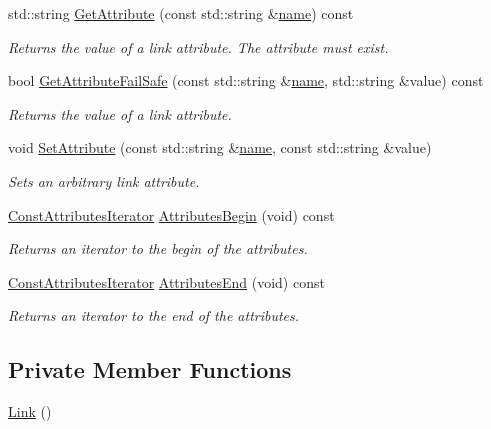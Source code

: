 \begin{DoxyCompactItemize}
std\+::string \hyperlink{classns3_1_1TopologyReader_1_1Link_abb927bd850c3d4c0bd801ceaf1a4ac48}{Get\+Attribute} (const std\+::string \&\hyperlink{generate__test__data__lte__spectrum__model_8m_ab74e6bf80237ddc4109968cedc58c151}{name}) const 
\begin{DoxyCompactList}\small\item\em Returns the value of a link attribute. The attribute must exist. \end{DoxyCompactList}\item 
bool \hyperlink{classns3_1_1TopologyReader_1_1Link_a40f157ff28ec3f1f39c1c7da71e8b374}{Get\+Attribute\+Fail\+Safe} (const std\+::string \&\hyperlink{generate__test__data__lte__spectrum__model_8m_ab74e6bf80237ddc4109968cedc58c151}{name}, std\+::string \&value) const 
\begin{DoxyCompactList}\small\item\em Returns the value of a link attribute. \end{DoxyCompactList}\item 
void \hyperlink{classns3_1_1TopologyReader_1_1Link_a4e36a88532cb6bb36b342aedf8b1d78f}{Set\+Attribute} (const std\+::string \&\hyperlink{generate__test__data__lte__spectrum__model_8m_ab74e6bf80237ddc4109968cedc58c151}{name}, const std\+::string \&value)
\begin{DoxyCompactList}\small\item\em Sets an arbitrary link attribute. \end{DoxyCompactList}\item 
\hyperlink{classns3_1_1TopologyReader_1_1Link_a44b7c023b81df04836df21e9f577b3a3}{Const\+Attributes\+Iterator} \hyperlink{classns3_1_1TopologyReader_1_1Link_a5cfb3a97a442d2853c06173c9c6ad923}{Attributes\+Begin} (void) const 
\begin{DoxyCompactList}\small\item\em Returns an iterator to the begin of the attributes. \end{DoxyCompactList}\item 
\hyperlink{classns3_1_1TopologyReader_1_1Link_a44b7c023b81df04836df21e9f577b3a3}{Const\+Attributes\+Iterator} \hyperlink{classns3_1_1TopologyReader_1_1Link_ae3eb300b1be0105da1d27182088ab048}{Attributes\+End} (void) const 
\begin{DoxyCompactList}\small\item\em Returns an iterator to the end of the attributes. \end{DoxyCompactList}\end{DoxyCompactItemize}
\subsection*{Private Member Functions}
\begin{DoxyCompactItemize}
\item 
\hyperlink{classns3_1_1TopologyReader_1_1Link_a175c4c176304f05dbb77535f53409f53}{Link} ()
\end{DoxyCompactItemize}

